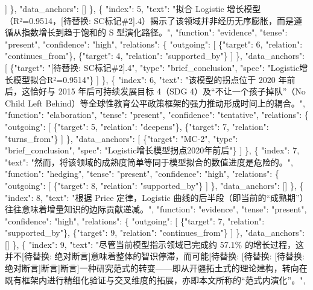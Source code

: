 \documentclass[12pt,a4paper]{article}
\begin{document}
            ]
          \},
          "data\_anchors": []
        \},
        \{
          "index": 5,
          "text": "拟合 Logistic 增长模型（R²=0.9514，[待替换: SC标记\#2].4）揭示了该领域并非经历无序膨胀，而是遵循从指数增长到趋于饱和的 S 型演化路径。",
          "function": "evidence",
          "tense": "present",
          "confidence": "high",
          "relations": \{
            "outgoing": [
              \{"target": 6, "relation": "continues\_from"\},
              \{"target": 4, "relation": "supported\_by"\}
            ]
          \},
          "data\_anchors": [
            \{"target": "[待替换: SC标记\#2].4", "type": "brief\_conclusion", "spec": "Logistic增长模型拟合R²=0.9514"\}
          ]
        \},
        \{
          "index": 6,
          "text": "该模型的拐点位于 2020 年前后，这恰好与 2015 年后可持续发展目标 4（SDG 4）及“不让一个孩子掉队”（No Child Left Behind）等全球性教育公平政策框架的强力推动形成时间上的耦合。",
          "function": "elaboration",
          "tense": "present",
          "confidence": "tentative",
          "relations": \{
            "outgoing": [
              \{"target": 5, "relation": "deepens"\},
              \{"target": 7, "relation": "turns\_from"\}
            ]
          \},
          "data\_anchors": [
            \{"target": "MC-2", "type": "brief\_conclusion", "spec": "Logistic增长模型拐点2020年前后"\}
          ]
        \},
        \{
          "index": 7,
          "text": "然而，将该领域的成熟度简单等同于模型拟合的数值进度是危险的。",
          "function": "hedging",
          "tense": "present",
          "confidence": "high",
          "relations": \{
            "outgoing": [
              \{"target": 8, "relation": "supported\_by"\}
            ]
          \},
          "data\_anchors": []
        \},
        \{
          "index": 8,
          "text": "根据 Price 定律，Logistic 曲线的后半段（即当前的“成熟期”）往往意味着增量知识的边际贡献递减。",
          "function": "evidence",
          "tense": "present",
          "confidence": "high",
          "relations": \{
            "outgoing": [
              \{"target": 7, "relation": "supported\_by"\},
              \{"target": 9, "relation": "continues\_from"\}
            ]
          \},
          "data\_anchors": []
        \},
        \{
          "index": 9,
          "text": "尽管当前模型指示领域已完成约 57.1\% 的增长过程，这并不[待替换: 绝对断言]意味着整体的智识停滞，而可能[待替换: [待替换: [待替换: 绝对断言]断言]断言]一种研究范式的转变——即从开疆拓土式的理论建构，转向在既有框架内进行精细化验证与交叉维度的拓展，亦即本文所称的“范式内演化”。",
\end{document}
